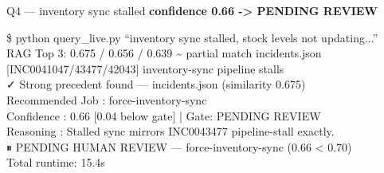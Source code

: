 \begin{frame}{Q4 — inventory sync stalled}
  {\color{camber}\ttfamily\small\bfseries confidence 0.66 -> PENDING REVIEW}
  \vspace{0.15cm}
  \begin{terminal}
    \$ python query\_live.py ``inventory sync stalled, stock levels not updating...''\\

    RAG Top 3: {\color{cauto}0.675 / 0.656 / 0.639 \textasciitilde{} partial match}  incidents.json\\
    \hspace*{0.4cm}[INC0041047/43477/42043] inventory-sync pipeline stalls\\

    ✓ Strong precedent found — incidents.json (similarity 0.675)\\

    Recommended Job : {\color{camber}force-inventory-sync}\\
    Confidence      : {\color{camber}0.66}  [0.04 below gate]  |  Gate: {\color{camber}PENDING REVIEW}\\
    Reasoning       : Stalled sync mirrors INC0043477 pipeline-stall exactly.\\

    {\color{camber}⏸  PENDING HUMAN REVIEW  —  force-inventory-sync  (0.66 < 0.70)}\\
    Total runtime: 15.4s
  \end{terminal}
\end{frame}

